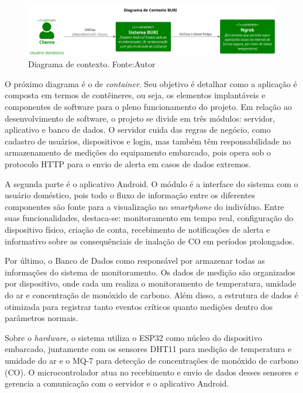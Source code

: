 \begin{figure}[ht]
    \centering
    \includegraphics[width=.87\textwidth]{img/context-diagram.png}
    \caption{Diagrama de contexto. Fonte:Autor}\label{figContextDiagram}
\end{figure}

O próximo diagrama é o de \textit{container}. Seu objetivo é detalhar como a aplicação é composta em termos de contêineres, ou seja, os elementos implantáveis e componentes de software 
para o pleno funcionamento do projeto. Em relação ao desenvolvimento de software, o projeto se divide em três módulos: servidor, aplicativo e banco de dados. O servidor cuida das regras
de negócio, como cadastro de usuários, dispositivos e login, mas também têm responsabilidade no armazenamento de medições do equipamento embarcado, pois opera sob o protocolo HTTP para o envio 
de alerta em casos de dados extremos.

A segunda parte é o aplicativo Android. O módulo é a interface do sistema com o usuário doméstico, pois todo o fluxo de informação entre os 
diferentes componentes são fonte para a visualização no \textit{smartphone} do indivíduo. Entre suas funcionalidades, destaca-se: monitoramento em tempo real, configuração do dispositivo físico, 
criação de conta, recebimento de notificações de alerta e informativo sobre as consequênciais de inalação de CO em períodos prolongados.

Por último, o Banco de Dados como responsável por armazenar todas as informações do sistema de monitoramento. Os dados de medição são organizados por dispositivo, onde 
cada um realiza o monitoramento de temperatura, umidade do ar e concentração de monóxido de carbono. Além disso, a estrutura de dados é otimizada para registrar tanto eventos críticos quanto 
medições dentro dos parâmetros normais.

Sobre o \textit{hardware}, o sistema utiliza o ESP32 como núcleo do dispositivo embarcado, juntamente com os sensores DHT11 para medição de temperatura e umidade do ar e o MQ-7 para 
detecção de concentrações de monóxido de carbono (CO). O microcontrolador atua no recebimento e envio de dados desses sensores e gerencia a comunicação com o servidor e o aplicativo Android. 

